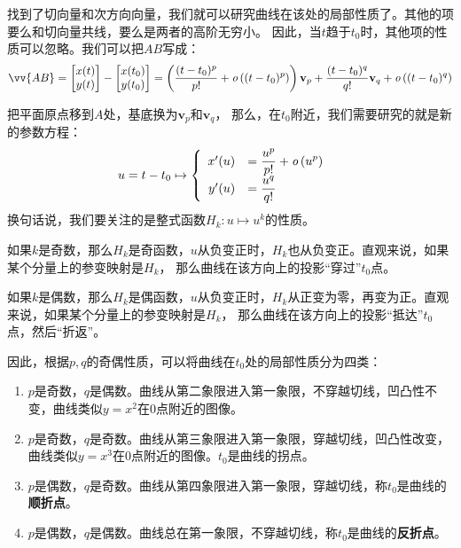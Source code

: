 \documentclass[12pt,UTF8]{ctexbook}
\newcommand{\olim}[1]{\mathit{o}\left(#1\right)}  %
\theoremstyle{definition}
\theoremstyle{plain}
\begin{document}
找到了切向量和次方向向量，我们就可以研究曲线在该处的局部性质了。其他的项要么和切向量共线，要么是两者的高阶无穷小。
因此，当$t$趋于$t_0$时，其他项的性质可以忽略。我们可以把$AB$写成：
$$
\vv{AB} = \begin{bmatrix} x(t) \\ y(t) \end{bmatrix} - \begin{bmatrix} x(t_0) \\ y(t_0) \end{bmatrix}
=
\left(\frac{(t - t_0)^p}{p!} + \olim{(t - t_0)^p}\right)\mathbf{v}_p
+
\frac{(t - t_0)^q}{q!}\mathbf{v}_q
+
\olim{(t - t_0)^q}
$$

把平面原点移到$A$处，基底换为$\mathbf{v}_p$和$\mathbf{v}_q$，
那么，在$t_0$附近，我们需要研究的就是新的参数方程：
\begin{align*}
    u = t - t_0 &\mapsto\left\{
        \begin{array}[]{rl}
            x'(u) &\displaystyle = \frac{u^p}{p!} + \olim{u^p} \\
            y'(u) &\displaystyle = \frac{u^q}{q!} \\
        \end{array}
    \right.
\end{align*}
换句话说，我们要关注的是整式函数$H_k: u\mapsto u^k$的性质。

如果$k$是奇数，那么$H_k$是奇函数，$u$从负变正时，$H_k$也从负变正。直观来说，如果某个分量上的参变映射是$H_k$，
那么曲线在该方向上的投影“穿过”$t_0$点。

如果$k$是偶数，那么$H_k$是偶函数，$u$从负变正时，$H_k$从正变为零，再变为正。直观来说，如果某个分量上的参变映射是$H_k$，
那么曲线在该方向上的投影“抵达”$t_0$点，然后“折返”。

因此，根据$p,q$的奇偶性质，可以将曲线在$t_0$处的局部性质分为四类：
\begin{enumerate}
    \item $p$是奇数，$q$是偶数。曲线从第二象限进入第一象限，不穿越切线，凹凸性不变，曲线类似$y = x^2$在$0$点附近的图像。
    \item $p$是奇数，$q$是奇数。曲线从第三象限进入第一象限，穿越切线，凹凸性改变，曲线类似$y = x^3$在$0$点附近的图像。$t_0$是曲线的拐点。
    \item $p$是偶数，$q$是奇数。曲线从第四象限进入第一象限，穿越切线，称$t_0$是曲线的\textbf{顺折点}。
    \item $p$是偶数，$q$是偶数。曲线总在第一象限，不穿越切线，称$t_0$是曲线的\textbf{反折点}。
\end{enumerate}
\end{document}
